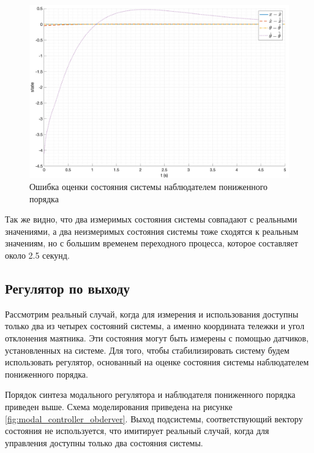 \begin{figure}[ht!]
    \centering
    \includegraphics[width=\textwidth]{media/plots/reduced_observer/reduced_observer_err_2.png}
    \caption{Ошибка оценки состояния системы наблюдателем пониженного порядка}
    \label{fig:reduced_observer_err_2}
\end{figure}
\FloatBarrier
Так же видно, что два измеримых состояния системы совпадают с реальными значениями, а два
неизмеримых состояния системы тоже сходятся к реальным значениям, но с большим временем переходного процесса,
которое составляет около 2.5 секунд.


\subsection{Регулятор по выходу}
Рассмотрим реальный случай, когда для измерения и использования доступны только 
два из четырех состояний системы, а именно координата тележки и угол отклонения маятника.
Эти состояния могут быть измерены с помощью датчиков, установленных на системе. Для того, чтобы
стабилизировать систему будем использовать регулятор, основанный на оценке состояния системы 
наблюдателем пониженного порядка. 

Порядок синтеза модального регулятора и наблюдателя пониженного порядка приведен выше. 
Схема моделирования приведена на рисунке \ref{fig:modal_controller_obderver}.
Выход подсистемы, соответствующий вектору состояния не используется, что 
имитирует реальный случай, когда для управления доступны только два состояния системы. 

